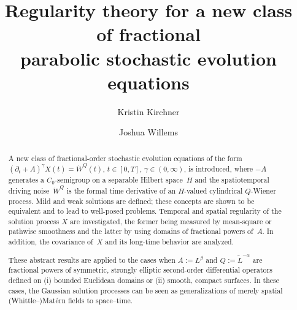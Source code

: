 \documentclass[reqno]{amsart}
\numberwithin{equation}{section}
\theoremstyle{remark}
\theoremstyle{definition}
\begin{document}
\author{Kristin Kirchner \and Joshua Willems}

\address[Kristin Kirchner]{Delft Institute of Applied Mathematics\\
	Delft University of Technology\\
	P.O.~Box 5031 \\ 
	2600 GA Delft \\
	The Netherlands.}


\address[Joshua Willems]{Delft Institute of Applied Mathematics\\
	Delft University of Technology\\
	P.O.~Box 5031 \\ 
	2600 GA Delft \\
	The Netherlands.}



\title[Analysis of fractional parabolic stochastic evolution equations]{%
	Regularity theory for a new class of fractional \\ 
	parabolic stochastic evolution equations}




\date{}

\begin{abstract}
	A new class of fractional-order stochastic evolution equations
	of the form 
	$(\partial_t + A)^\gamma X(t) = \dot{W}^Q(t)$, 
	$t\in[0,T]$,
	$\gamma \in (0,\infty)$, 
	is introduced, 
	where $-A$ generates a $C_0$-semigroup 
	on a separable Hilbert space~$H$ 
	and 
	the spatiotemporal driving noise~$\dot{W}^Q$ is
	the formal time derivative of
	an $H$-valued cylindrical $Q$-Wiener process.
	Mild and weak solutions are defined; 
	these concepts are shown to be equivalent 
	and to lead to well-posed problems.
	Temporal and spatial regularity of the solution process 
	$X$ are investigated,
	the former being measured by
	mean-square or pathwise smoothness  
	and the latter by using
	domains of fractional powers of~$A$.
	In addition, the covariance of~$X$ 
	and its long-time behavior 
	are analyzed. 
	
	These abstract results are applied to 
	the cases when 
	$A := L^\beta$ and $Q:=\widetilde{L}^{-\alpha}$ 
	are fractional powers of 
	symmetric, 
	strongly elliptic second-order
	differential operators 
	defined on (i) bounded Euclidean domains 
	or (ii) smooth, compact surfaces.
	In these cases, the 
	Gaussian solution processes 
	can be seen as  
	generalizations of 
	merely spatial 
	{(Whittle--)}Mat\'ern fields 
	to space--time. 
\end{abstract}
\end{document}
